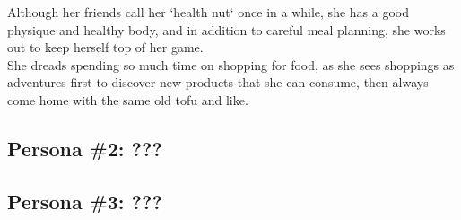 \documentclass[a4paper,10pt,oneside]{scrreprt}
\begin{document}
\begin{mdframed}
\begin{minipage}{\textwidth}
				
				
				Although her friends call her `health nut` once in a while, she has a good physique and healthy body, and in addition to careful meal planning, she works out to keep herself top of her game.\\
				
				She dreads spending so much time on shopping for food, as she sees shoppings as adventures first to discover new products that she can consume, then always come home with the same old tofu and like.\\
			\end{minipage}
		\end{mdframed}
	
		\subsection{Persona \#2: ???}
		
		\subsection{Persona \#3: ???}
\end{document}
